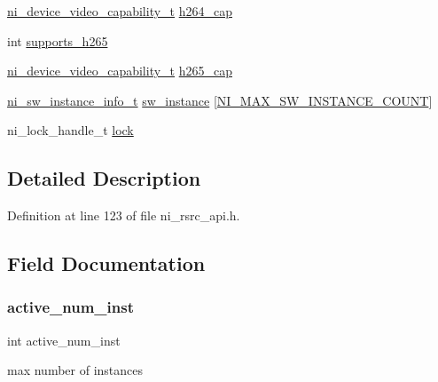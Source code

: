 \begin{DoxyCompactItemize}
\item 
\mbox{\hyperlink{ni__rsrc__api_8h_adf4d30f539dbb9bae2cdf26a53baafeb}{ni\+\_\+device\+\_\+video\+\_\+capability\+\_\+t}} \mbox{\hyperlink{struct__ni__device__info_a6ad91fe8a36dc0e3637172ee67ad9885}{h264\+\_\+cap}}
\item 
int \mbox{\hyperlink{struct__ni__device__info_a9c6f83e33dc71b4d467c01919a0a54e8}{supports\+\_\+h265}}
\item 
\mbox{\hyperlink{ni__rsrc__api_8h_adf4d30f539dbb9bae2cdf26a53baafeb}{ni\+\_\+device\+\_\+video\+\_\+capability\+\_\+t}} \mbox{\hyperlink{struct__ni__device__info_a14659846c62b4d04fd543bb70e50be25}{h265\+\_\+cap}}
\item 
\mbox{\hyperlink{ni__rsrc__api_8h_a9e007bba8915f56c2a096715a4edf473}{ni\+\_\+sw\+\_\+instance\+\_\+info\+\_\+t}} \mbox{\hyperlink{struct__ni__device__info_a7460eb590b00930e34e42bf85e90b2f1}{sw\+\_\+instance}} \mbox{[}\mbox{\hyperlink{ni__rsrc__api_8h_a573b669de80ab750cfc3d96da9dbd507}{N\+I\+\_\+\+M\+A\+X\+\_\+\+S\+W\+\_\+\+I\+N\+S\+T\+A\+N\+C\+E\+\_\+\+C\+O\+U\+NT}}\mbox{]}
\item 
ni\+\_\+lock\+\_\+handle\+\_\+t \mbox{\hyperlink{struct__ni__device__info_ad70c9254e2a51831bfd8b769d977a6a9}{lock}}
\end{DoxyCompactItemize}


\subsection{Detailed Description}


Definition at line 123 of file ni\+\_\+rsrc\+\_\+api.\+h.



\subsection{Field Documentation}
\mbox{\label{struct__ni__device__info_a1de23e60eea7b12c7ed6122588591368}} 
\subsubsection{\texorpdfstring{active\_num\_inst}{active\_num\_inst}}
{\footnotesize\ttfamily int active\+\_\+num\+\_\+inst}

max number of instances 

